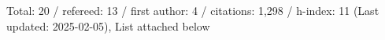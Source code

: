 Total: 20 / refereed: 13 / first author: 4 / citations: 1,298 / h-index: 11 (Last updated: 2025-02-05), List attached below